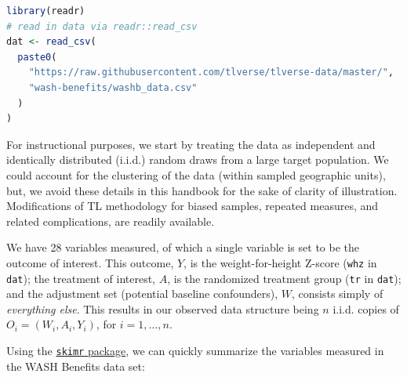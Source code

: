 \documentclass[
  12pt, krantz2,
]{krantz}
\newcommand{\passthrough}[1]{#1}
\newcommand{\1}{\mathbbm{1}}
\theoremstyle{definition}
\theoremstyle{definition}
\theoremstyle{definition}
\theoremstyle{definition}
\theoremstyle{remark}
\begin{document}
\begin{lstlisting}[language=R]
library(readr)
# read in data via readr::read_csv
dat <- read_csv(
  paste0(
    "https://raw.githubusercontent.com/tlverse/tlverse-data/master/",
    "wash-benefits/washb_data.csv"
  )
)
\end{lstlisting}

For instructional purposes, we start by treating the data as independent and
identically distributed (i.i.d.) random draws from a large target population. We
could account for the clustering of the data (within sampled geographic units),
but, we avoid these details in this handbook for the sake of clarity of
illustration. Modifications of TL methodology for biased samples, repeated
measures, and related complications, are readily available.

We have 28 variables measured, of which a single variable is set to
be the outcome of interest. This outcome, \(Y\), is the weight-for-height Z-score
(\passthrough{\lstinline!whz!} in \passthrough{\lstinline!dat!}); the treatment of interest, \(A\), is the randomized treatment
group (\passthrough{\lstinline!tr!} in \passthrough{\lstinline!dat!}); and the adjustment set (potential baseline confounders),
\(W\), consists simply of \emph{everything else}. This results in our observed data
structure being \(n\) i.i.d. copies of \(O_i = (W_i, A_i, Y_i)\), for \(i = 1, \ldots, n\).

Using the \href{https://CRAN.R-project.org/package=skimr}{\passthrough{\lstinline!skimr!} package}, we can
quickly summarize the variables measured in the WASH Benefits data set:
\end{document}
